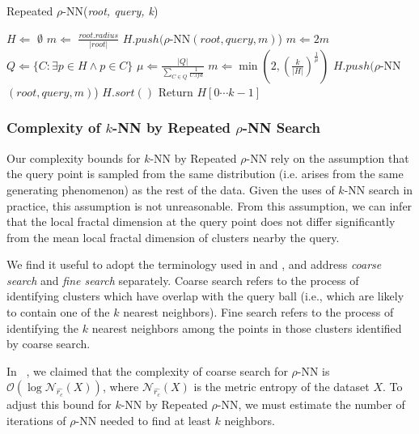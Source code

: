 \begin{algorithm} %
    \caption{Repeated $\rho$-NN(\emph{root, query, k})} %
    \label{alg:knn-by-rnn} %
    \begin{algorithmic} %
        \STATE $H \Leftarrow$ $\emptyset$
        \STATE $m \Leftarrow$ $\frac{root.radius}{|root|}$
            \STATE $H.push(\rho$-NN$(root, query, m)$)
            \STATE $m \Leftarrow 2m$
        \ENDWHILE
            \STATE $Q \Leftarrow \{ C: \exists p \in H \land p \in C \}$
            \STATE $\mu \Leftarrow \frac{|Q|}{\sum_{C \in Q} \frac{1}{C.lfd}} $
            \STATE $m \Leftarrow \min \left(2, \left({\frac{k}{|H|}}\right)^{\frac{1}{\mu}}\right)$
            \STATE $H.push(\rho$-NN$(root, query, m)$)
        \ENDWHILE
        \STATE $H.sort()$
        \STATE Return $H[0 \cdots k-1]$
    \end{algorithmic}
    \end{algorithm}


\subsubsection{Complexity of \texorpdfstring{$k$}{k}-NN by Repeated \texorpdfstring{$\rho$}{p}-NN Search}
\label{subsubsec:methods:repeated-rnn-complexity}

Our complexity bounds for $k$-NN by Repeated $\rho$-NN rely on the assumption that the query point is sampled from the same distribution (i.e. arises from the same generating phenomenon) as the rest of the data.
Given the uses of $k$-NN search in practice, this assumption is not unreasonable.
From this assumption, we can infer that the local fractal dimension at the query point does not differ significantly from the mean local fractal dimension of clusters nearby the query.

We find it useful to adopt the terminology used in \cite{ishaq2019clustered} and \cite{yu2015entropy}, and address \emph{coarse search} and \emph{fine search} separately.
Coarse search refers to the process of identifying clusters which have overlap with the query ball (i.e., which are likely to contain one of the $k$ nearest neighbors). 
Fine search refers to the process of identifying the $k$ nearest neighbors among the points in those clusters identified by coarse search.

In ~\cite{ishaq2019clustered}, we claimed that the complexity of coarse search for $\rho$-NN is $\mathcal{O}(\log\mathcal{N}_{\hat{r_c}}(X))$, 
where $\mathcal{N}_{\hat{r_c}}(X)$ is the metric entropy of the dataset $X$. 
To adjust this bound for $k$-NN by Repeated $\rho$-NN, we must estimate the number of iterations of $\rho$-NN needed to find at least $k$ neighbors.

